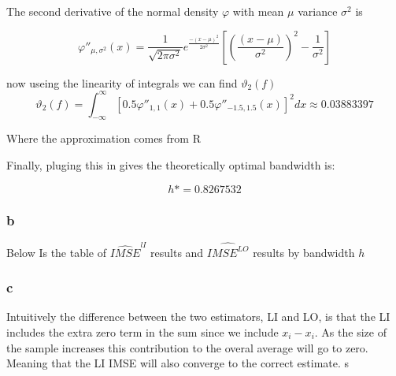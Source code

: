 \documentclass[11pt]{article}
\begin{document}
The second derivative of the normal density $\varphi$ with mean $\mu$ variance $\sigma^2$ is 

$$\varphi''_{\mu, \sigma^2}(x) = \frac{1}{\sqrt{2 \pi \sigma^2 }}e^{\frac{-(x-\mu)^2}{2\sigma^2}} \left[ \left( \frac{(x - \mu)}{\sigma^2} \right)^2 - \frac{1}{\sigma^2} \right]
$$

now useing the linearity of integrals we can find $\vartheta_{2}(f)$
$$ \vartheta_{2}(f) = \int_{-\infty}^{\infty} [0.5 \varphi''_{1,1}(x) + 0.5 \varphi''_{-1.5, 1.5}(x)]^2dx \approx 0.03883397
$$

Where the approximation comes from R 

Finally, pluging this in gives the theoretically optimal bandwidth is: 

$$h* = 0.8267532
$$

\subsubsection{b}

Below Is the table of $\widehat{IMSE}^{lI}$ results and $\widehat{IMSE^{LO}}$ results by bandwidth $h$ 

\begin{center}
	
\end{center}

\subsubsection{c}
Intuitively the difference between the two estimators, LI and LO, is that the LI includes the extra zero term in the sum since we include $x_i - x_i$. As the size of the sample increases this contribution to the overal average will go to zero. Meaning that the LI IMSE will also converge to the correct estimate. s

\end{document}
